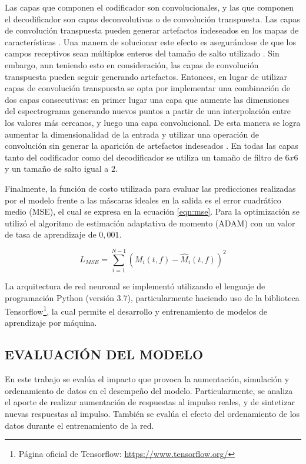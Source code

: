Las capas que componen el codificador son convolucionales, y las que componen el decodificador son capas deconvolutivas o de convolución transpuesta. Las capas de convolución transpuesta pueden generar artefactos indeseados en los mapas de características \cite{checkerboard}.  Una manera de solucionar este efecto es asegurándose de que los campos receptivos sean múltiplos enteros del tamaño de salto utilizado \cite{check1}. Sin embargo, aun teniendo esto en consideración, las capas de convolución transpuesta pueden seguir generando artefactos. Entonces, en lugar de utilizar capas de convolución transpuesta se opta por implementar una combinación de dos capas consecutivas: en primer lugar una capa que aumente las dimensiones del espectrograma generando nuevos puntos a partir de una interpolación entre los valores más cercanos, y luego una capa convolucional. De esta manera se logra aumentar la dimensionalidad de la entrada y utilizar una operación de convolución sin generar la aparición de artefactos indeseados \cite{check2}. 
En todas las capas tanto del codificador como del decodificador se utiliza un tamaño de filtro de $6x6$ y un tamaño de salto igual a $2$. 

Finalmente, la función de costo utilizada para evaluar las predicciones realizadas por el modelo frente a las máscaras ideales en la salida es el error cuadrático medio (MSE), el cual se expresa en la ecuación \ref{eqn:mse}. Para la optimización se utilizó el algoritmo de estimación adaptativa de momento (ADAM) \cite{adam} con un valor de tasa de aprendizaje de $0,001$. 

\begin{equation}
\label{eqn:mse}
	L_{MSE} = \sum_{i=1}^{N-1}(M_{i}(t,f) - \hat{M}_{i}(t,f))^{2}
\end{equation}

La arquitectura de red neuronal se implementó utilizando el lenguaje de programación Python (versión 3.7), particularmente haciendo uso de la biblioteca Tensorflow\footnote{Página oficial de Tensorflow: \url{https://www.tensorflow.org/}}, la cual permite el desarrollo y entrenamiento de modelos de aprendizaje por máquina.  


\subsection[Evaluación del modelo]{EVALUACIÓN DEL MODELO}
En este trabajo se evalúa el impacto que provoca la aumentación, simulación y ordenamiento de datos en el desempeño del modelo.
Particularmente, se analiza el aporte de realizar aumentación de respuestas al impulso reales, y de sintetizar nuevas respuestas al impulso. También se evalúa el efecto del ordenamiento de los datos durante el entrenamiento de la red.

